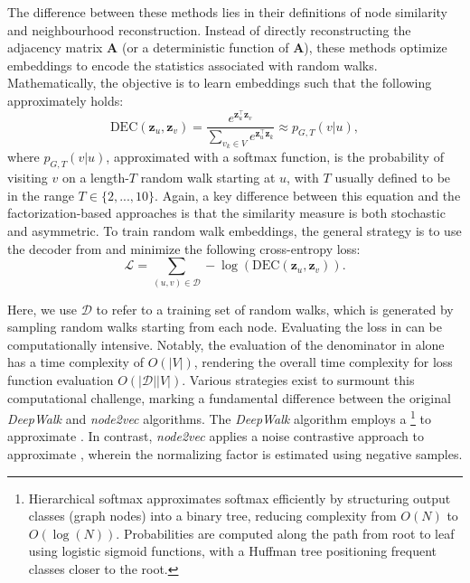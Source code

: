 The difference between these methods lies in their definitions of node similarity and neighbourhood reconstruction. Instead of directly reconstructing the adjacency matrix $ \mathbf{A} $ (or a deterministic function of $ \mathbf{A} $), these methods optimize embeddings to encode the statistics associated with random walks. Mathematically, the objective is to learn embeddings such that the following approximately holds:
\begin{equation}\label{eq:randomWalkdec}
    \text{DEC}(\mathbf{z}_u, \mathbf{z}_v) = \frac{e^{\mathbf{z}_u^\top\mathbf{z}_v}}{\sum_{v_k\in V} e^{\mathbf{z}_u^\top\mathbf{z}_k}} \approx p_{G,T}(v|u),
\end{equation}
where $p_{G,T}(v|u)$, approximated with a softmax function, is the probability of visiting $v$ on a length-$T$ random walk starting at $u$, with $T$ usually defined to be in the range $T\in\{2,...,10\}$. Again, a key difference between this equation and the factorization-based approaches is that the similarity measure is both stochastic and asymmetric.
To train random walk embeddings, the general strategy is to use the decoder from  and minimize the following cross-entropy loss:
\begin{equation}\label{eq:randomWalkloss}
    \mathcal{L} = \sum_{(u,v)\in\mathcal{D}} -\log(\text{DEC}(\mathbf{z}_u, \mathbf{z}_v)).
\end{equation}

Here, we use $\mathcal{D}$ to refer to a training set of random walks, which is generated by sampling random walks starting from each node.
Evaluating the loss in  can be computationally intensive. Notably, the evaluation of the denominator in  alone has a time complexity of $ O(|V|) $, rendering the overall time complexity for loss function evaluation $ O(|\mathcal{D}||V|) $. Various strategies exist to surmount this computational challenge, marking a fundamental difference between the original \textit{DeepWalk} and \textit{node2vec} algorithms. The \textit{DeepWalk} algorithm employs a \footnote{Hierarchical softmax approximates softmax efficiently by structuring output classes (graph nodes) into a binary tree, reducing complexity from $ O(N) $ to $ O(\log(N)) $. Probabilities are computed along the path from root to leaf using logistic sigmoid functions, with a Huffman tree positioning frequent classes closer to the root.} to approximate . In contrast, \textit{node2vec} applies a noise contrastive approach to approximate , wherein the normalizing factor is estimated using negative samples.

